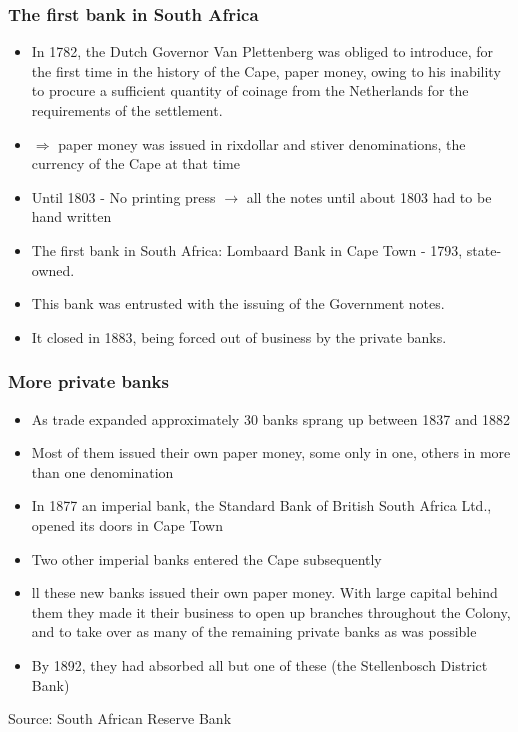\documentclass[11pt]{beamer}
\begin{document}
\begin{frame}
\frametitle{The first bank in South Africa}
\begin{itemize}
\item In 1782, the Dutch Governor Van Plettenberg was obliged to introduce, for the first time in the history of the Cape, paper money, owing to his inability to procure a sufficient quantity of coinage from the Netherlands for the requirements of the settlement.
\item $\Rightarrow$ paper money was issued in rixdollar and stiver denominations, the currency of the Cape at that time
\item Until 1803 - No printing press $\rightarrow$ all the notes until about 1803 had to be hand written
\item The first bank in South Africa: Lombaard Bank in Cape Town - 1793, state-owned.
\item This bank was entrusted with the issuing of the Government notes.
\item It closed in 1883, being forced out of business by the private banks.

\end{itemize}
\end{frame}


\begin{frame}
\frametitle{More private banks}
\begin{itemize}
\item As trade expanded approximately 30 banks sprang up between 1837 and 1882
\item Most of them issued their own paper money, some only in one, others in more than one denomination
\item In 1877 an imperial bank, the Standard Bank of British South Africa Ltd., opened its doors in Cape Town
\item Two other imperial banks entered the Cape subsequently
\item ll these new banks issued their own paper money. With large capital behind them they made it their business to open up branches throughout the Colony, and to take over as many of the remaining private banks as was possible
\item By 1892, they had absorbed all but one of these (the Stellenbosch District Bank)
\end{itemize}
\tiny{Source: South African Reserve Bank}
\end{frame}
\end{document}
